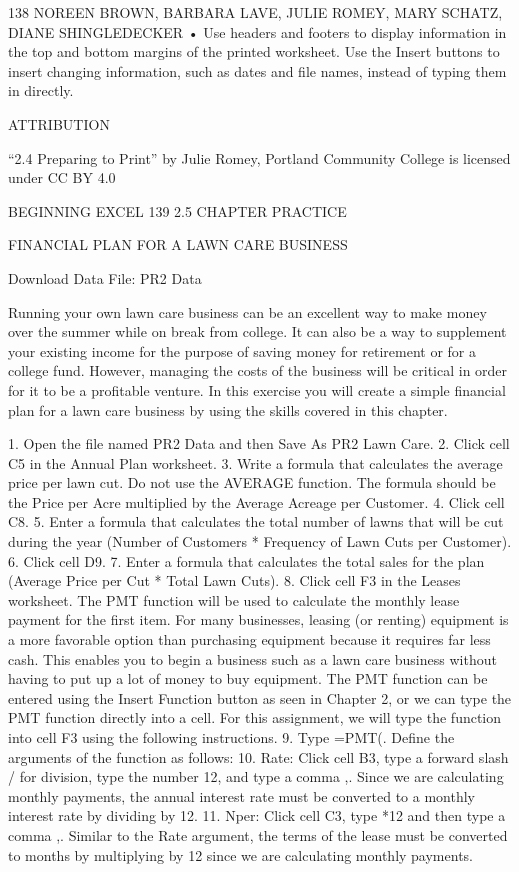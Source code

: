 138 NOREEN BROWN, BARBARA LAVE, JULIE ROMEY, MARY SCHATZ, DIANE SHINGLEDECKER
• Use headers and footers to display information in the top and bottom margins of the printed worksheet.
Use the Insert buttons to insert changing information, such as dates and file names, instead of typing them
in directly.



ATTRIBUTION

“2.4 Preparing to Print” by Julie Romey, Portland Community College is licensed under CC BY 4.0




BEGINNING EXCEL 139
2.5 CHAPTER PRACTICE




FINANCIAL PLAN FOR A LAWN CARE BUSINESS

Download Data File: PR2 Data

Running your own lawn care business can be an excellent way to make money over the summer while
on break from college. It can also be a way to supplement your existing income for the purpose of
saving money for retirement or for a college fund. However, managing the costs of the business will
be critical in order for it to be a profitable venture. In this exercise you will create a simple financial
plan for a lawn care business by using the skills covered in this chapter.

1. Open the file named PR2 Data and then Save As PR2 Lawn Care.
2. Click cell C5 in the Annual Plan worksheet.
3. Write a formula that calculates the average price per lawn cut. Do not use the AVERAGE
function. The formula should be the Price per Acre multiplied by the Average Acreage per
Customer.
4. Click cell C8.
5. Enter a formula that calculates the total number of lawns that will be cut during the year
(Number of Customers * Frequency of Lawn Cuts per Customer).
6. Click cell D9.
7. Enter a formula that calculates the total sales for the plan (Average Price per Cut * Total Lawn
Cuts).
8. Click cell F3 in the Leases worksheet. The PMT function will be used to calculate the monthly
lease payment for the first item. For many businesses, leasing (or renting) equipment is a more
favorable option than purchasing equipment because it requires far less cash. This enables you
to begin a business such as a lawn care business without having to put up a lot of money to buy
equipment. The PMT function can be entered using the Insert Function button as seen in
Chapter 2, or we can type the PMT function directly into a cell. For this assignment, we will
type the function into cell F3 using the following instructions.
9. Type =PMT(. Define the arguments of the function as follows:
10. Rate: Click cell B3, type a forward slash / for division, type the number 12, and type a comma ,.
Since we are calculating monthly payments, the annual interest rate must be converted to a
monthly interest rate by dividing by 12.
11. Nper: Click cell C3, type *12 and then type a comma ,. Similar to the Rate argument, the terms
of the lease must be converted to months by multiplying by 12 since we are calculating monthly
payments.


